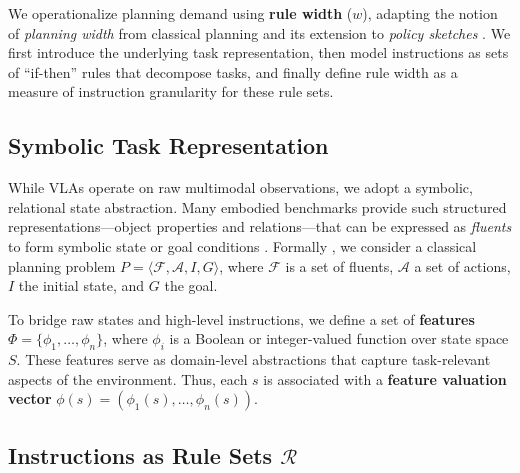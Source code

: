 \documentclass{article}
\begin{document}
We operationalize planning demand using \textbf{rule width} ($w$), adapting the notion of \emph{planning width} from classical planning \cite{DBLP:conf/ecai/LipovetzkyG12} and its extension to \emph{policy sketches} \cite{DBLP:conf/aaai/BonetG21,DBLP:conf/aips/DrexlerSG22,DBLP:journals/jair/DrexlerSG24}. We first introduce the underlying task representation, then model instructions as sets of ``if-then'' rules that decompose tasks, and finally define rule width as a measure of instruction granularity for these rule sets.

\subsection{Symbolic Task Representation}

While VLAs operate on raw multimodal observations, we adopt a symbolic, relational state abstraction. Many embodied benchmarks provide such structured representations---object properties and relations---that can be expressed as \emph{fluents} to form symbolic state or goal conditions \cite{shridhar2020alfred,DBLP:conf/corl/LiHGMPWFLSKL0F024}. Formally , we consider a classical planning problem $P = \langle \mathcal{F}, \mathcal{A}, I, G \rangle$, where $\mathcal{F}$ is a set of fluents, $\mathcal{A}$ a set of actions, $I$ the initial state, and $G$ the goal. 

To bridge raw states and high-level instructions, we define a set of \textbf{features} $\Phi = \{\phi_1, \ldots, \phi_n\}$, where $\phi_i$ is a Boolean or integer-valued function over state space $S$. These features serve as domain-level abstractions that capture task-relevant aspects of the environment. Thus, each $s$ is associated with a \textbf{feature valuation vector} $\phi(s) = \left(\phi_1(s), \ldots, \phi_n(s)\right)$.

\subsection{Instructions as Rule Sets $\mathcal{R}$}
\end{document}
